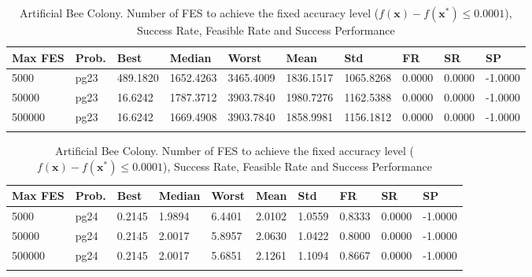 \documentclass[10pt, a4paper]{book}
\begin{document}
\begin{center}
\begin{longtable}{l l l l l l l l l l}
\textbf{Max FES} & \textbf{Prob.} & \textbf{Best} & \textbf{Median} & \textbf{Worst} & \textbf{Mean} & \textbf{Std} & \textbf{FR} & \textbf{SR} & \textbf{SP} \\
\hline
5000 & pg23 & 489.1820 & 1652.4263 & 3465.4009 & 1836.1517 & 1065.8268 & 0.0000 & 0.0000 & -1.0000 \\
50000 & pg23 & 16.6242 & 1787.3712 & 3903.7840 & 1980.7276 & 1162.5388 & 0.0000 & 0.0000 & -1.0000 \\
500000 & pg23 & 16.6242 & 1669.4908 & 3903.7840 & 1858.9981 & 1156.1812 & 0.0000 & 0.0000 & -1.0000 \\

\caption{ Artificial Bee Colony. Number of FES to achieve the fixed accuracy level ($f(\mathbf{x}) - f(\mathbf{x}^{*}) \leq 0.0001$), Success Rate, Feasible Rate and Success Performance }
\end{longtable}
\end{center}

\begin{center}
\begin{longtable}{l l l l l l l l l l}
\textbf{Max FES} & \textbf{Prob.} & \textbf{Best} & \textbf{Median} & \textbf{Worst} & \textbf{Mean} & \textbf{Std} & \textbf{FR} & \textbf{SR} & \textbf{SP} \\
\hline
5000 & pg24 & 0.2145 & 1.9894 & 6.4401 & 2.0102 & 1.0559 & 0.8333 & 0.0000 & -1.0000 \\
50000 & pg24 & 0.2145 & 2.0017 & 5.8957 & 2.0630 & 1.0422 & 0.8000 & 0.0000 & -1.0000 \\
500000 & pg24 & 0.2145 & 2.0017 & 5.6851 & 2.1261 & 1.1094 & 0.8667 & 0.0000 & -1.0000 \\

\caption{ Artificial Bee Colony. Number of FES to achieve the fixed accuracy level ($f(\mathbf{x}) - f(\mathbf{x}^{*}) \leq 0.0001$), Success Rate, Feasible Rate and Success Performance }
\end{longtable}
\end{center}
\end{document}
